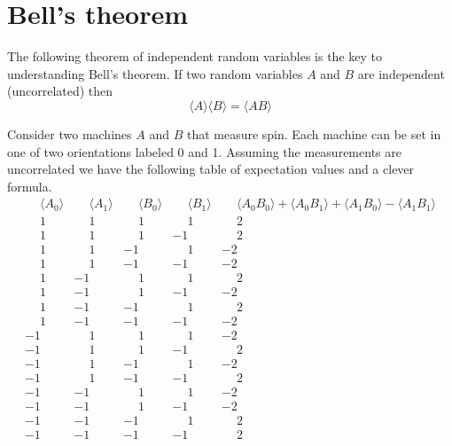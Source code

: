 

\section*{Bell's theorem}

The following theorem of independent random variables
is the key to understanding Bell's theorem.
If two random variables $A$ and $B$ are independent (uncorrelated) then
\begin{equation*}
\langle A\rangle\langle B\rangle=\langle AB\rangle
\end{equation*}

Consider two machines $A$ and $B$ that measure spin.
Each machine can be set in one of two orientations labeled 0 and 1.
Assuming the measurements are uncorrelated we have the following table
of expectation values and a clever formula.
\begin{equation*}
\begin{matrix}
\phantom{-}\langle A_0\rangle & \phantom{-}\langle A_1\rangle
& \phantom{-}\langle B_0\rangle & \phantom{-}\langle B_1\rangle
& \phantom{-}\langle A_0B_0\rangle+\langle A_0B_1\rangle+\langle A_1B_0\rangle-\langle A_1B_1\rangle
\\
\phantom{-}1 & \phantom{-}1 & \phantom{-}1 & \phantom{-}1 & \phantom{-}2
\\
\phantom{-}1 & \phantom{-}1 & \phantom{-}1 &           -1 & \phantom{-}2
\\
\phantom{-}1 & \phantom{-}1 &           -1 & \phantom{-}1 &           -2
\\
\phantom{-}1 & \phantom{-}1 &           -1 &           -1 &           -2
\\
\phantom{-}1 &          -1 & \phantom{-}1 & \phantom{-}1 & \phantom{-}2
\\
\phantom{-}1 &          -1 & \phantom{-}1 &           -1 &           -2
\\
\phantom{-}1 &          -1 &           -1 & \phantom{-}1 & \phantom{-}2
\\
\phantom{-}1 &          -1 &           -1 &           -1 &           -2
\\
          -1 & \phantom{-}1 & \phantom{-}1 & \phantom{-}1 &           -2
\\
          -1 & \phantom{-}1 & \phantom{-}1 &           -1 & \phantom{-}2
\\
          -1 & \phantom{-}1 &           -1 & \phantom{-}1 &           -2
\\
          -1 & \phantom{-}1 &           -1 &           -1 & \phantom{-}2
\\
          -1 &           -1 & \phantom{-}1 & \phantom{-}1 &           -2
\\
          -1 &           -1 & \phantom{-}1 &           -1 &           -2
\\
          -1 &           -1 &           -1 & \phantom{-}1 & \phantom{-}2
\\
          -1 &           -1 &           -1 &           -1 & \phantom{-}2
\end{matrix}
\end{equation*}

